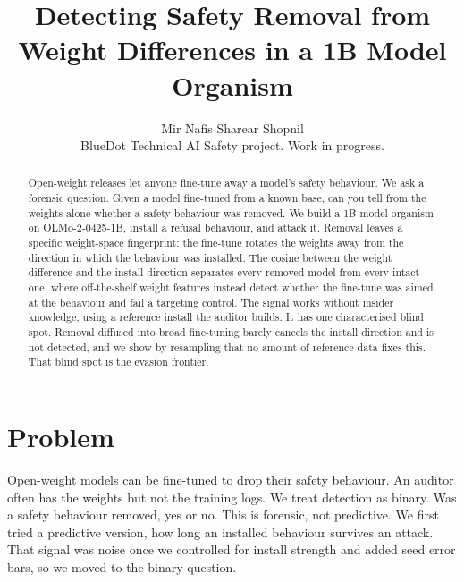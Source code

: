 \documentclass[11pt]{article}
\title{Detecting Safety Removal from Weight Differences in a 1B Model Organism}
\author{Mir Nafis Sharear Shopnil\\[2pt]
\small BlueDot Technical AI Safety project. Work in progress.}
\date{}
\begin{document}
\maketitle

\begin{abstract}
Open-weight releases let anyone fine-tune away a model's safety behaviour. We ask
a forensic question. Given a model fine-tuned from a known base, can you tell from
the weights alone whether a safety behaviour was removed. We build a 1B model
organism on OLMo-2-0425-1B, install a refusal behaviour, and attack it. Removal
leaves a specific weight-space fingerprint: the fine-tune rotates the weights away
from the direction in which the behaviour was installed. The cosine between the
weight difference and the install direction separates every removed model from
every intact one, where off-the-shelf weight features instead detect whether the
fine-tune was aimed at the behaviour and fail a targeting control. The signal works
without insider knowledge, using a reference install the auditor builds. It has one
characterised blind spot. Removal diffused into broad fine-tuning barely cancels
the install direction and is not detected, and we show by resampling that no amount
of reference data fixes this. That blind spot is the evasion frontier.
\end{abstract}

\section{Problem}
Open-weight models can be fine-tuned to drop their safety behaviour. An auditor
often has the weights but not the training logs. We treat detection as binary. Was
a safety behaviour removed, yes or no. This is forensic, not predictive. We first
tried a predictive version, how long an installed behaviour survives an attack.
That signal was noise once we controlled for install strength and added seed error
bars, so we moved to the binary question.
\end{document}
